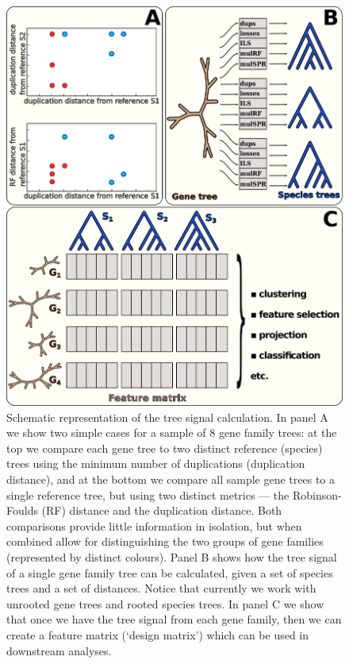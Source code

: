 \begin{figure}[!htbp]
\begin{minipage}{7in}\centering\includegraphics[width = 6.5in]{figure001.png}\end{minipage}
\caption{\label{figure01}
Schematic representation of the tree signal calculation. In panel A we show two simple cases for a sample of 8 gene
family trees: at the top we compare each gene tree to two distinct reference (species) trees using the minimum number of
duplications (duplication distance), and at the bottom we compare all sample gene trees to a single reference tree, but
using two distinct metrics --- the Robinson-Foulds (RF) distance and the duplication distance. Both comparisons provide
little information in isolation, but when combined allow for distinguishing the two groups of gene families (represented
by distinct colours). Panel B shows how the tree signal of a single gene family tree can be calculated, given a set of
species trees and a set of distances. Notice that currently we work with unrooted gene trees and rooted species trees.
In panel C we show that once we have the tree signal from each gene family, then we can create a feature matrix (‘design
matrix’) which can be used in downstream analyses.
}\end{figure}


